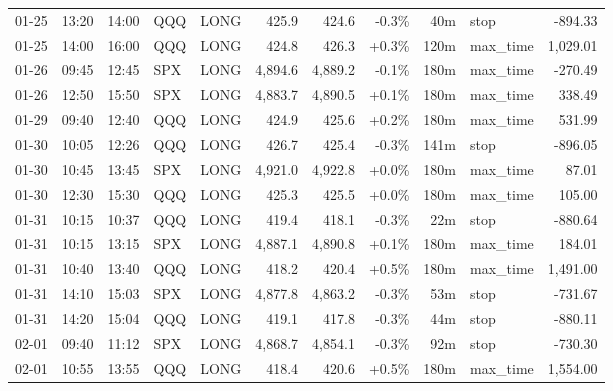 \documentclass[11pt,a4paper,twoside]{article}
\begin{document}
\begin{center}
\begin{longtable}{>{\color{txtmain}}l l l l l r r r r >{\color{txtmain}}l r}
01-25 & 13:20 & 14:00 & QQQ & LONG & 425.9 & 424.6 & \textcolor{lossred}{-0.3\%} & 40m & stop & \textcolor{lossred}{-894.33} \\
01-25 & 14:00 & 16:00 & QQQ & LONG & 424.8 & 426.3 & \textcolor{wingreen}{+0.3\%} & 120m & max\_time & \textcolor{wingreen}{1,029.01} \\
01-26 & 09:45 & 12:45 & SPX & LONG & 4,894.6 & 4,889.2 & \textcolor{lossred}{-0.1\%} & 180m & max\_time & \textcolor{lossred}{-270.49} \\
01-26 & 12:50 & 15:50 & SPX & LONG & 4,883.7 & 4,890.5 & \textcolor{wingreen}{+0.1\%} & 180m & max\_time & \textcolor{wingreen}{338.49} \\
01-29 & 09:40 & 12:40 & QQQ & LONG & 424.9 & 425.6 & \textcolor{wingreen}{+0.2\%} & 180m & max\_time & \textcolor{wingreen}{531.99} \\
01-30 & 10:05 & 12:26 & QQQ & LONG & 426.7 & 425.4 & \textcolor{lossred}{-0.3\%} & 141m & stop & \textcolor{lossred}{-896.05} \\
01-30 & 10:45 & 13:45 & SPX & LONG & 4,921.0 & 4,922.8 & \textcolor{wingreen}{+0.0\%} & 180m & max\_time & \textcolor{wingreen}{87.01} \\
01-30 & 12:30 & 15:30 & QQQ & LONG & 425.3 & 425.5 & \textcolor{wingreen}{+0.0\%} & 180m & max\_time & \textcolor{wingreen}{105.00} \\
01-31 & 10:15 & 10:37 & QQQ & LONG & 419.4 & 418.1 & \textcolor{lossred}{-0.3\%} & 22m & stop & \textcolor{lossred}{-880.64} \\
01-31 & 10:15 & 13:15 & SPX & LONG & 4,887.1 & 4,890.8 & \textcolor{wingreen}{+0.1\%} & 180m & max\_time & \textcolor{wingreen}{184.01} \\
01-31 & 10:40 & 13:40 & QQQ & LONG & 418.2 & 420.4 & \textcolor{wingreen}{+0.5\%} & 180m & max\_time & \textcolor{wingreen}{1,491.00} \\
01-31 & 14:10 & 15:03 & SPX & LONG & 4,877.8 & 4,863.2 & \textcolor{lossred}{-0.3\%} & 53m & stop & \textcolor{lossred}{-731.67} \\
01-31 & 14:20 & 15:04 & QQQ & LONG & 419.1 & 417.8 & \textcolor{lossred}{-0.3\%} & 44m & stop & \textcolor{lossred}{-880.11} \\
02-01 & 09:40 & 11:12 & SPX & LONG & 4,868.7 & 4,854.1 & \textcolor{lossred}{-0.3\%} & 92m & stop & \textcolor{lossred}{-730.30} \\
02-01 & 10:55 & 13:55 & QQQ & LONG & 418.4 & 420.6 & \textcolor{wingreen}{+0.5\%} & 180m & max\_time & \textcolor{wingreen}{1,554.00} \\

\end{longtable}
\end{center}
\end{document}
